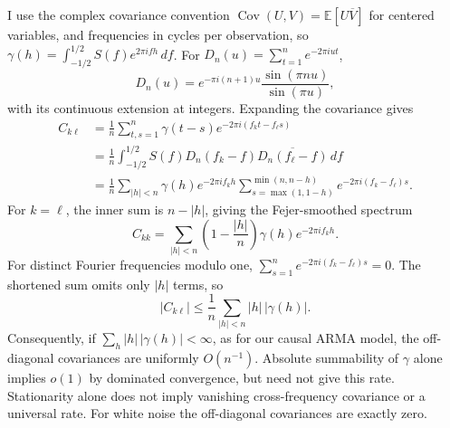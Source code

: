 \documentclass[lang=en,11pt,a4paper,citestyle =authoryear,nobib=true]{elegantpaper}
\begin{document}
\begin{enumerate}[label=\arabic*.,leftmargin=*]
I use the complex covariance convention
$\operatorname{Cov}(U,V)=\mathbb E[U\overline V]$ for centered variables,
and frequencies in cycles per observation, so
$\gamma(h)=\int_{-1/2}^{1/2}S(f)e^{2\pi ifh}\,df$.
For $D_n(u)=\sum_{t=1}^ne^{-2\pi iut}$,
\[
D_n(u)=e^{-\pi i(n+1)u}\frac{\sin(\pi nu)}{\sin(\pi u)},
\]
with its continuous extension at integers. Expanding the covariance gives
\begin{align*}
C_{k\ell}
&=\frac1n\sum_{t,s=1}^n\gamma(t-s)e^{-2\pi i(f_kt-f_\ell s)}\\
&=\frac1n\int_{-1/2}^{1/2}
S(f)D_n(f_k-f)\overline{D_n(f_\ell-f)}\,df\\
&=\frac1n\sum_{|h|<n}\gamma(h)e^{-2\pi if_kh}
\sum_{s=\max(1,1-h)}^{\min(n,n-h)}e^{-2\pi i(f_k-f_\ell)s}.
\end{align*}
For $k=\ell$, the inner sum is $n-|h|$, giving the Fejer-smoothed spectrum
\[
C_{kk}=\sum_{|h|<n}\left(1-\frac{|h|}{n}\right)\gamma(h)e^{-2\pi if_kh}.
\]
For distinct Fourier frequencies modulo one,
$\sum_{s=1}^ne^{-2\pi i(f_k-f_\ell)s}=0$.
The shortened sum omits only $|h|$ terms, so
\[
|C_{k\ell}|\leq\frac1n\sum_{|h|<n}|h|\,|\gamma(h)|.
\]
Consequently, if $\sum_h|h|\,|\gamma(h)|<\infty$, as for our causal ARMA
model, the off-diagonal covariances are uniformly $O(n^{-1})$.
Absolute summability of $\gamma$ alone implies $o(1)$ by dominated
convergence, but need not give this rate. Stationarity alone does not imply
vanishing cross-frequency covariance or a universal rate.
For white noise the off-diagonal covariances are exactly zero.
\vspace{1em}
\end{enumerate}

\FloatBarrier
\end{document}
